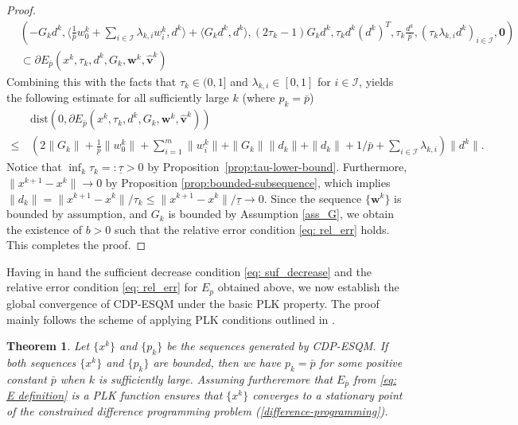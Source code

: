 \documentclass[11pt,a4paper]{article}
\def\hat{\widehat}\def\Hat{\widehat}
\newtheorem{theorem}{Theorem}[section]
\theoremstyle{plain}
\begin{document}
\begin{proof}
\begin{equation*}
  \begin{aligned}
     &\left( 
     -G_kd^k, 
     \big\langle \frac{1}{\bar p}w_0^k + \sum_{i \in \mathcal{I}} \lambda_{k,i} w_i^k, d^k \big\rangle + \langle G_kd^k, d^k \rangle, 
     (2\tau_k - 1)G_k d^k, 
     \tau_k d^k (d^k)^T, 
     \tau_k \frac{d^k}{\bar p}, 
     ( \tau_k \lambda_{k,i} d^k )_{i \in \mathcal{I}}, 
     \mathbf{0}
     \right) \\ 
     &\subset \partial E_{\bar p}(x^k, \tau_k, d^k, G_k, \mathbf{w}^k, \mathbf{\hat{v}}^k)
  \end{aligned}  
\end{equation*}
Combining this with the facts that $\tau_k \in (0,1]$ and $\lambda_{k,i} \in [0,1]$ for $i \in \mathcal{I}$, yields the following estimate for all sufficiently large $k$ (where $p_k = \bar{p}$)
\begin{equation*}
    \begin{aligned}
        &\mathrm{dist}\left(0, \partial E_{\bar p}(x^k,\tau_k,d^k,G_k,\mathbf{w}^k,\mathbf{\hat{v}}^k) \right) \\
        \le \, & \left( 2\|G_k\|+ \frac{1}{\bar p}\| w^k_0\|+\sum_{i=1}^m\| w^k_i\| + \|G_k\|\|d_k\| + \|d_k\| + 1/\bar{p} + \sum_{i \in \mathcal{I}}\lambda_{k,i} \right) \|d^k\|.
    \end{aligned}
\end{equation*}
Notice that $ \inf_k \tau_k =: \underline{\tau} > 0$ by Proposition~\ref{prop:tau-lower-bound}. Furthermore, $\| x^{k+1} - x^k \| \rightarrow 0$ by Proposition \ref{prop:bounded-subsequence}, which implies $\|d_k\| = \| x^{k+1} - x^k \|/\tau_k \le \| x^{k+1} - x^k \|/\underline{\tau}  \rightarrow 0$. Since the sequence $\{\mathbf{w}^k\}$ is bounded by assumption, and $G_k$ is bounded by Assumption \ref{ass_G}, we obtain the existence of $b > 0$ such that the relative error condition \eqref{eq: rel_err} holds. This completes the proof.
\end{proof}\vspace*{0.05in}


Having in hand the sufficient decrease condition \eqref{eq: suf_decrease} and the relative error condition \eqref{eq: rel_err} for $	E_{p}$ obtained above, we now establish the global convergence of CDP-ESQM under the basic PLK property. The proof mainly follows the scheme of applying PLK conditions outlined in \cite{Attouch2013,bento2025convergence}.

\begin{theorem}\label{thm: KL_convergence}
Let  \( \{x^k\} \)  and \( \{p_k\} \) be the sequences generated by CDP-ESQM. 
If both sequences \( \{x^k\} \) and \( \{p_k\} \) are bounded, then we have $p_k = \bar{p}$  for some positive constant $\bar{p}$ when $k$ is sufficiently large. 
Assuming furtheremore that $E_{\bar{p}}$ from \eqref{eq: E definition} is a PLK function ensures that \( \{x^k\} \) converges to a stationary point of the constrained difference programming problem {\rm(\ref{difference-programming})}.
\end{theorem}
\end{document}
